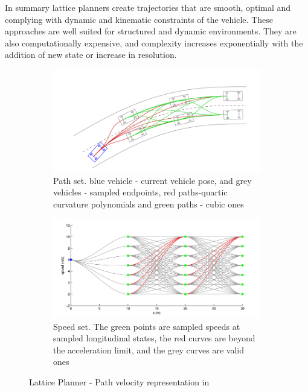 In summary lattice planners create trajectories that are smooth, optimal and complying with dynamic and kinematic constraints of the vehicle. These approaches are well suited for structured and dynamic environments. They are also computationally expensive, and complexity increases exponentially with the addition of new state or increase in resolution.

\begin{figure}
	\centering
	\begin{subfigure}{.51\textwidth}
		\centering
		\includegraphics[width=1.0\linewidth]{Images/related_work/traj_optim_1.png}
		\caption{Path set. blue vehicle - current vehicle pose, and grey vehicles - sampled endpoints, red paths-quartic curvature polynomials and green paths - cubic ones}
		\label{trajoptsub1}
	\end{subfigure}\hspace{.01\textwidth}
	\begin{subfigure}{.47\textwidth}
		\centering
		\includegraphics[width=1.0\linewidth]{Images/related_work/traj_optim_2.png}
		\caption{Speed set. The green points are sampled speeds at sampled longitudinal states, the red curves are beyond the acceleration limit, and the grey curves are valid ones}
		\label{trajoptsub2}
	\end{subfigure}
	\caption{Lattice Planner - Path velocity representation in \cite{traj_planner_optimization}}
	\label{trajopt}
\end{figure}

